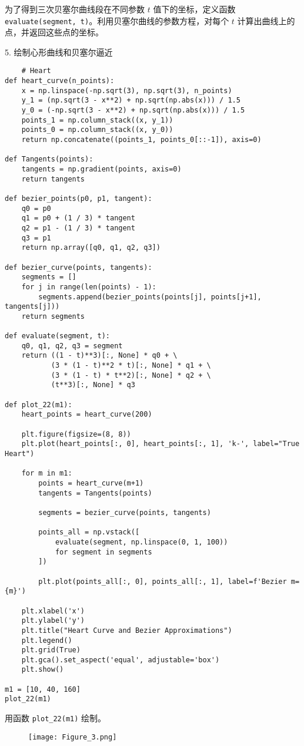 \documentclass[a4paper]{article}
\begin{document}
为了得到三次贝塞尔曲线段在不同参数 \(t\) 值下的坐标，定义函数 \texttt{evaluate(segment, t)}。利用贝塞尔曲线的参数方程，对每个 \(t\) 计算出曲线上的点，并返回这些点的坐标。

5. 绘制心形曲线和贝塞尔逼近
\begin{lstlisting}
    # Heart
def heart_curve(n_points):
    x = np.linspace(-np.sqrt(3), np.sqrt(3), n_points)
    y_1 = (np.sqrt(3 - x**2) + np.sqrt(np.abs(x))) / 1.5
    y_0 = (-np.sqrt(3 - x**2) + np.sqrt(np.abs(x))) / 1.5
    points_1 = np.column_stack((x, y_1))
    points_0 = np.column_stack((x, y_0))
    return np.concatenate((points_1, points_0[::-1]), axis=0)

def Tangents(points):
    tangents = np.gradient(points, axis=0)
    return tangents

def bezier_points(p0, p1, tangent):
    q0 = p0
    q1 = p0 + (1 / 3) * tangent
    q2 = p1 - (1 / 3) * tangent
    q3 = p1
    return np.array([q0, q1, q2, q3])

def bezier_curve(points, tangents):
    segments = []
    for j in range(len(points) - 1):
        segments.append(bezier_points(points[j], points[j+1], tangents[j]))
    return segments

def evaluate(segment, t):
    q0, q1, q2, q3 = segment
    return ((1 - t)**3)[:, None] * q0 + \
           (3 * (1 - t)**2 * t)[:, None] * q1 + \
           (3 * (1 - t) * t**2)[:, None] * q2 + \
           (t**3)[:, None] * q3

def plot_22(m1):
    heart_points = heart_curve(200)

    plt.figure(figsize=(8, 8))
    plt.plot(heart_points[:, 0], heart_points[:, 1], 'k-', label="True Heart")

    for m in m1:
        points = heart_curve(m+1)
        tangents = Tangents(points)

        segments = bezier_curve(points, tangents)

        points_all = np.vstack([
            evaluate(segment, np.linspace(0, 1, 100))
            for segment in segments
        ])

        plt.plot(points_all[:, 0], points_all[:, 1], label=f'Bezier m={m}')

    plt.xlabel('x')
    plt.ylabel('y')
    plt.title("Heart Curve and Bezier Approximations")
    plt.legend()
    plt.grid(True)
    plt.gca().set_aspect('equal', adjustable='box')
    plt.show()

m1 = [10, 40, 160]
plot_22(m1)
\end{lstlisting}

用函数 \texttt{plot\_22(m1)} 绘制。
\begin{figure}[H] 
\centering 
\texttt{[image: Figure\_3.png]}
\end{figure}
\end{document}
